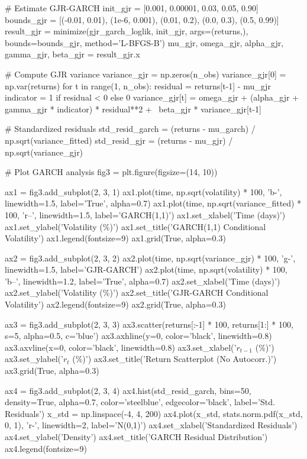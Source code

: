 \documentclass[a4paper, 11pt]{article}
\begin{document}
\begin{pycode}
# Estimate GJR-GARCH
init_gjr = [0.001, 0.00001, 0.03, 0.05, 0.90]
bounds_gjr = [(-0.01, 0.01), (1e-6, 0.001), (0.01, 0.2),
              (0.0, 0.3), (0.5, 0.99)]
result_gjr = minimize(gjr_garch_loglik, init_gjr, args=(returns,),
                      bounds=bounds_gjr, method='L-BFGS-B')
mu_gjr, omega_gjr, alpha_gjr, gamma_gjr, beta_gjr = result_gjr.x

# Compute GJR variance
variance_gjr = np.zeros(n_obs)
variance_gjr[0] = np.var(returns)
for t in range(1, n_obs):
    residual = returns[t-1] - mu_gjr
    indicator = 1 if residual < 0 else 0
    variance_gjr[t] = omega_gjr + (alpha_gjr + gamma_gjr * indicator) * residual**2 + \
                      beta_gjr * variance_gjr[t-1]

# Standardized residuals
std_resid_garch = (returns - mu_garch) / np.sqrt(variance_fitted)
std_resid_gjr = (returns - mu_gjr) / np.sqrt(variance_gjr)

# Plot GARCH analysis
fig3 = plt.figure(figsize=(14, 10))

ax1 = fig3.add_subplot(2, 3, 1)
ax1.plot(time, np.sqrt(volatility) * 100, 'b-', linewidth=1.5,
         label='True', alpha=0.7)
ax1.plot(time, np.sqrt(variance_fitted) * 100, 'r--', linewidth=1.5,
         label='GARCH(1,1)')
ax1.set_xlabel('Time (days)')
ax1.set_ylabel('Volatility (\%)')
ax1.set_title('GARCH(1,1) Conditional Volatility')
ax1.legend(fontsize=9)
ax1.grid(True, alpha=0.3)

ax2 = fig3.add_subplot(2, 3, 2)
ax2.plot(time, np.sqrt(variance_gjr) * 100, 'g-', linewidth=1.5,
         label='GJR-GARCH')
ax2.plot(time, np.sqrt(volatility) * 100, 'b--', linewidth=1.2,
         label='True', alpha=0.7)
ax2.set_xlabel('Time (days)')
ax2.set_ylabel('Volatility (\%)')
ax2.set_title('GJR-GARCH Conditional Volatility')
ax2.legend(fontsize=9)
ax2.grid(True, alpha=0.3)

ax3 = fig3.add_subplot(2, 3, 3)
ax3.scatter(returns[:-1] * 100, returns[1:] * 100, s=5, alpha=0.5, c='blue')
ax3.axhline(y=0, color='black', linewidth=0.8)
ax3.axvline(x=0, color='black', linewidth=0.8)
ax3.set_xlabel('$r_{t-1}$ (\%)')
ax3.set_ylabel('$r_t$ (\%)')
ax3.set_title('Return Scatterplot (No Autocorr.)')
ax3.grid(True, alpha=0.3)

ax4 = fig3.add_subplot(2, 3, 4)
ax4.hist(std_resid_garch, bins=50, density=True, alpha=0.7,
         color='steelblue', edgecolor='black', label='Std. Residuals')
x_std = np.linspace(-4, 4, 200)
ax4.plot(x_std, stats.norm.pdf(x_std, 0, 1), 'r-', linewidth=2, label='N(0,1)')
ax4.set_xlabel('Standardized Residuals')
ax4.set_ylabel('Density')
ax4.set_title('GARCH Residual Distribution')
ax4.legend(fontsize=9)


\end{pycode}
\end{document}
